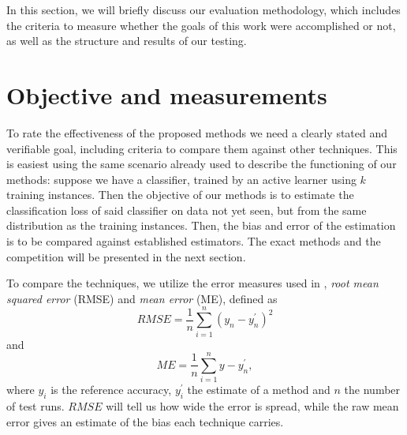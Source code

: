\label{evaluation}

In this section, we will briefly discuss our evaluation methodology, which includes the criteria to measure whether the goals of this work were accomplished or not, as well as the structure and results of our testing.

\section{Objective and measurements}

To rate the effectiveness of the proposed methods we need a clearly stated and verifiable goal, including criteria to compare them against other techniques. This is easiest using the same scenario already used to describe the functioning of our methods: suppose we have a classifier, trained by an active learner using $k$ training instances. Then the objective of our methods is to estimate the classification loss of said classifier on data not yet seen, but from the same distribution as the training instances. Then, the bias and error of the estimation is to be compared against established estimators. The exact methods and the competition will be presented in the next section.

To compare the techniques, we utilize the error measures used in \cite{FigueroaEtal2012}, \textit{root mean squared error} (RMSE) and \textit{mean error} (ME), defined as
\begin{equation}
RMSE = \frac{1}{n} \sum_{i=1}^{n} \left(y_n - y_n^{'}\right)^2
\end{equation}
and
\begin{equation}ME = \frac{1}{n} \sum_{i=1}^{n} y - y_n^{'},
\end{equation}
where $y_i$ is the reference accuracy, $y_i^{'}$ the estimate of a method and $n$ the number of test runs. $RMSE$ will tell us how wide the error is spread, while the raw mean error gives an estimate of the bias each technique carries.


